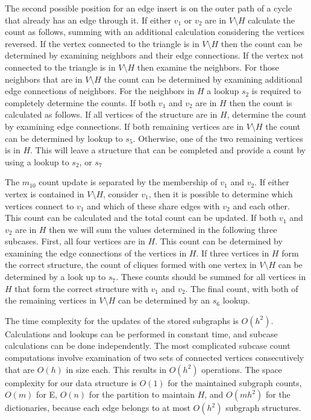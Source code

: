 \documentclass[11pt]{article}
\begin{document}
The second possible position for an edge insert is on the outer path of a cycle that already has an edge through it.  If either $v_1$ or $v_2$ are in $V \setminus H$ calculate the count as follows, summing with an additional calculation considering the vertices reversed. If the vertex connected to the triangle is in $V \setminus H$ then the count can be determined by examining neighbors and their edge connections.  If the vertex not connected to the triangle is in $V \setminus H$ then examine the neighbors.  For those neighbors that are in $V \setminus H$ the count can be determined by examining additional edge connections of neighbors.  For the neighbors in $H$ a lookup $s_2$ is required to completely determine the counts.  If both $v_1$ and $v_2$ are in $H$ then the count is calculated as follows. If all vertices of the structure are in $H$, determine the count by examining edge connections.  If both remaining vertices are in $V \setminus H$ the count can be determined by lookup to $s_5$.  Otherwise, one of the two remaining vertices is in $H$.  This will leave a structure that can be completed and provide a count by using a lookup to $s_2$, or $s_7$


The $m_{10}$ count update is separated by the membership of $v_1$ and $v_2$.  If either vertex is contained in $V \setminus H$, consider $v_1$, then it is possible to determine which vertices connect to $v_1$ and which of these share edges with $v_2$ and each other.  This count can be calculated and the total count can be updated.  If both $v_1$ and $v_2$ are in $H$ then we will sum the values determined in the following three subcases.  First, all four vertices are in $H$.  This count can be determined by examining the edge connections of the vertices in $H$.  If three vertices in $H$ form the correct structure, the count of cliques formed with one vertex in $V \setminus H$ can be determined by a look up to $s_7$.  These counts should be summed for all vertices in $H$ that form the correct structure with $v_1$ and $v_2$.  The final count, with both of the remaining vertices in $V \setminus H$ can be determined by an $s_6$ lookup.

The time complexity for the updates of the stored subgraphs is $O(h^2)$.  Calculations and lookups can be performed in constant time, and subcase calculations can be done independently.  The most complicated subcase count computations involve examination of two sets of connected vertices consecutively that are $O(h)$ in size each.  This results in $O(h^2)$ operations.  The space complexity for our data structure is $O(1)$ for the maintained subgraph counts, $O(m)$ for E, $O(n)$ for the partition to maintain $H$, and $O(mh^2)$ for the dictionaries, because each edge belongs to at most $O(h^2)$ subgraph structures.
\end{document}
